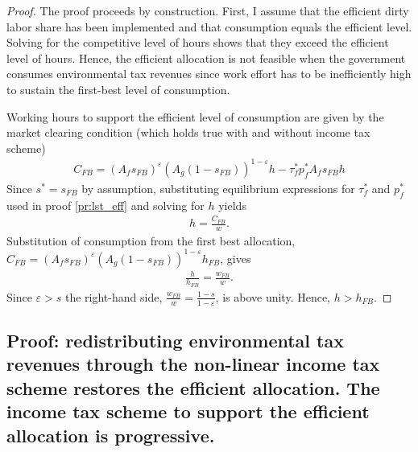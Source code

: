 \begin{proof}
	The proof proceeds by construction. First, I assume that the efficient dirty labor share has been implemented and that consumption equals the efficient level. Solving for the competitive level of hours shows that they exceed the efficient level of hours.  Hence, the efficient allocation is not feasible when the government consumes environmental tax revenues since work effort has to be inefficiently high to sustain the first-best level of consumption. 
	
	Working hours to support the efficient level of consumption are given by the market clearing condition  (which holds true with and without income tax scheme)
	\begin{align}
	C_{FB} = \left(A_f s_{FB}\right)^\varepsilon\left(A_g(1-s_{FB})\right)^{1-\varepsilon}h-\tau_f^*p_f^*A_fs_{FB}h
	\end{align}
	Since $s^*=s_{FB}$ by assumption, substituting equilibrium expressions for $\tau_f^*$ and $p_f^*$ used in proof \ref{pr:lst_eff} and solving for $h$ yields
	\begin{align}
	h=\frac{C_{FB}}{w}.
	\end{align}
	Substitution of consumption from the first best allocation, $C_{FB}=\left(A_f s_{FB}\right)^\varepsilon\left(A_g(1-s_{FB})\right)^{1-\varepsilon}h_{FB}$, gives
	\begin{align}
	\frac{h}{h_{FB}}=\frac{w_{FB}}{w}.
	\end{align}
	Since $\varepsilon>s$ the right-hand side, $\frac{w_{FB}}{w}=\frac{1-s}{1-\varepsilon}$, is above unity. Hence, $h>h_{FB}$. 
\end{proof}

\subsection{Proof: redistributing environmental tax revenues through the non-linear income tax scheme restores the efficient allocation. The income tax scheme to support the efficient allocation is progressive.}

